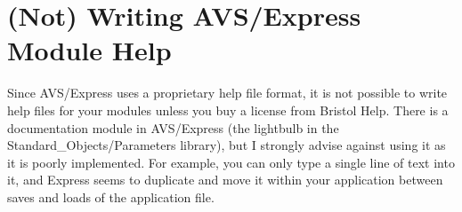 \section{(Not) Writing AVS/Express Module Help}
\label{(Not) Writing AVS/Express Module Help}

Since AVS/Express uses a proprietary help file format, it is not possible to
write help files for your modules unless you buy a license from
Bristol Help.  There is a documentation module in AVS/Express (the lightbulb
in the Standard\_Objects/Parameters library), but I strongly advise against
using it as it is poorly implemented.  For example, you can only type a
single line of text into it, and Express seems to duplicate and move it
within your application between saves and loads of the application file.
